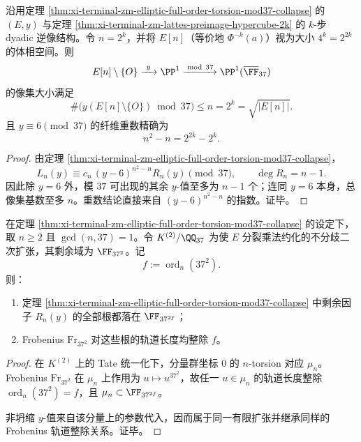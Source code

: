 \begin{corollary}\label{cor:xi-terminal-zm-badprime37-square-root-holographic-compression}
沿用定理 \ref{thm:xi-terminal-zm-elliptic-full-order-torsion-mod37-collapse} 的 \((E,y)\) 与定理 \ref{thm:xi-terminal-zm-lattes-preimage-hypercube-2k} 的 \(k\)-步 dyadic 逆像结构。令 \(n=2^k\)，并将 \(E[n]\)（等价地 \(\Phi^{-k}(a)\)）视为大小 \(4^k=2^{2k}\) 的体相空间。则
\[
E[n]\setminus\{O\}\xrightarrow{\ y\ }\PP^1\xrightarrow{\bmod\,37}\PP^1(\overline{\FF}_{37})
\]
的像集大小满足
\[
\#\bigl(y(E[n]\setminus\{O\})\bmod 37\bigr)\le n=2^k=\sqrt{|E[n]|}.
\]
且 \(y\equiv 6\pmod{37}\) 的纤维重数精确为
\[
n^2-n=2^{2k}-2^k.
\]
\end{corollary}
\begin{proof}
由定理 \ref{thm:xi-terminal-zm-elliptic-full-order-torsion-mod37-collapse}，
\[
L_n(y)\equiv c_n\,(y-6)^{n^2-n}R_n(y)\pmod{37},
\qquad
\deg R_n=n-1.
\]
因此除 \(y=6\) 外，模 \(37\) 可出现的其余 \(y\)-值至多为 \(n-1\) 个；连同 \(y=6\) 本身，总像集基数至多 \(n\)。重数结论直接来自 \((y-6)^{n^2-n}\) 的指数。证毕。
\end{proof}

\begin{proposition}\label{prop:xi-terminal-zm-noncollapsed-boundary-frobenius-period}
在定理 \ref{thm:xi-terminal-zm-elliptic-full-order-torsion-mod37-collapse} 的设定下，取 \(n\ge 2\) 且 \(\gcd(n,37)=1\)。令 \(K^{(2)}/\QQ_{37}\) 为使 \(E\) 分裂乘法约化的不分歧二次扩张，其剩余域为 \(\FF_{37^2}\)。记
\[
f:=\operatorname{ord}_{n}(37^2).
\]
则：
\begin{enumerate}
  \item 定理 \ref{thm:xi-terminal-zm-elliptic-full-order-torsion-mod37-collapse} 中剩余因子 \(R_n(y)\) 的全部根都落在 \(\FF_{37^{2f}}\)；
  \item Frobenius \(\mathrm{Fr}_{37^2}\) 对这些根的轨道长度均整除 \(f\)。
\end{enumerate}
\end{proposition}
\begin{proof}
在 \(K^{(2)}\) 上的 Tate 统一化下，分量群坐标 \(0\) 的 \(n\)-torsion 对应 \(\mu_n\)。Frobenius \(\mathrm{Fr}_{37^2}\) 在 \(\mu_n\) 上作用为 \(u\mapsto u^{37^2}\)，故任一 \(u\in\mu_n\) 的轨道长度整除 \(\operatorname{ord}_n(37^2)=f\)，且 \(\mu_n\subset \FF_{37^{2f}}\)。

非坍缩 \(y\)-值来自该分量上的参数代入，因而属于同一有限扩张并继承同样的 Frobenius 轨道整除关系。证毕。
\end{proof}

